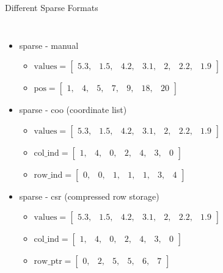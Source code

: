 \documentclass[aspectratio=169,xcolor=dvipsnames]{beamer}
\begin{document}
\begin{frame}{Different Sparse Formats}
    \begin{columns}[c] %

\begin{itemize}
\item sparse - manual
  \begin{itemize}
     	\item $\mathrm{values} =  \begin{bmatrix} 
		5.3, & 1.5, & 4.2, & 3.1, & 2, & 2.2, & 1.9 
		\end{bmatrix}$

		\item $\mathrm{pos} = \begin{bmatrix}
		1, & 4, & 5, & 7, & 9, & 18, & 20 
		\end{bmatrix}$
	\end{itemize}
\item sparse - coo (coordinate list)
	\begin{itemize}
		\item $\mathrm{values} = \begin{bmatrix}
		5.3, & 1.5, & 4.2, & 3.1, & 2, & 2.2, & 1.9 
		\end{bmatrix}$
		\item $\mathrm{col\_ind} = \begin{bmatrix}
		1, & 4, & 0, & 2, & 4, & 3, & 0 
		\end{bmatrix}$
		\item $\mathrm{row\_ind} = \begin{bmatrix}
		0, & 0, & 1, & 1, & 1, & 3, & 4 
		\end{bmatrix}$
	\end{itemize}
\item sparse - csr (compressed row storage)
	\begin{itemize}
       \item $\mathrm{values} = \begin{bmatrix}
		5.3, & 1.5, & 4.2, & 3.1, & 2, & 2.2, & 1.9 
		\end{bmatrix}$
		\item $\mathrm{col\_ind} = \begin{bmatrix}
		1, & 4, & 0, & 2, & 4, & 3, & 0 
		\end{bmatrix}$
		\item $\mathrm{row\_ptr} = \begin{bmatrix}
		0, & 2, & 5, & 5, & 6, & 7 
		\end{bmatrix}$
	\end{itemize}
\end{itemize}
        

\end{columns}
\end{frame}
\end{document}

